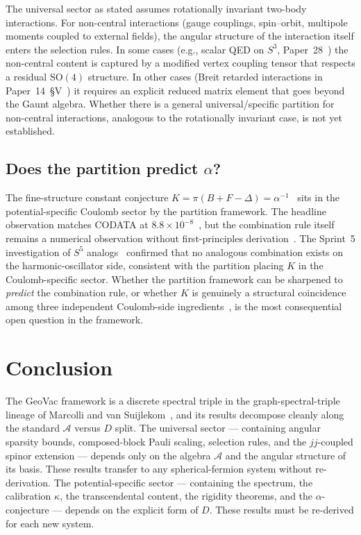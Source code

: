 \documentclass[twocolumn,pra,amsmath,amssymb,superscriptaddress]{revtex4-2}
\begin{document}
The universal sector as stated assumes rotationally invariant
two-body interactions.  For non-central interactions (gauge
couplings, spin--orbit, multipole moments coupled to external
fields), the angular structure of the interaction itself enters the
selection rules.  In some cases (e.g., scalar QED on $S^3$,
Paper~28~\cite{paper28}) the non-central content is captured by a
modified vertex coupling tensor that respects a residual
$\mathrm{SO}(4)$ structure.  In other cases (Breit retarded
interactions in Paper~14~\S V~\cite{paper14}) it requires an
explicit reduced matrix element that goes beyond the Gaunt algebra.
Whether there is a general universal/specific partition for
non-central interactions, analogous to the rotationally invariant
case, is not yet established.

\subsection{Does the partition predict $\alpha$?}

The fine-structure constant conjecture
$K = \pi(B + F - \Delta) = \alpha^{-1}$~\cite{paper2_alpha} sits in
the potential-specific Coulomb sector by the partition framework.
The headline observation matches CODATA at
$8.8 \times 10^{-8}$~\cite{paper2_alpha}, but the combination rule
itself remains a numerical observation without first-principles
derivation~\cite{curve_fit_audit}.  The Sprint~5 investigation of
$S^5$ analogs~\cite{paper25} confirmed that no analogous combination
exists on the harmonic-oscillator side, consistent with the
partition placing $K$ in the Coulomb-specific sector.  Whether the
partition framework can be sharpened to \emph{predict} the
combination rule, or whether $K$ is genuinely a structural
coincidence among three independent Coulomb-side
ingredients~\cite{paper2_alpha}, is the most consequential open
question in the framework.

\section{Conclusion}
\label{sec:conclusion}

The GeoVac framework is a discrete spectral triple in the
graph-spectral-triple lineage of Marcolli and van
Suijlekom~\cite{marcolli_vs2014}, and its results decompose cleanly
along the standard $\mathcal{A}$ versus $D$ split.  The universal
sector --- containing angular sparsity bounds, composed-block Pauli
scaling, selection rules, and the $jj$-coupled spinor extension ---
depends only on the algebra $\mathcal{A}$ and the angular structure
of its basis.  These results transfer to any spherical-fermion system
without re-derivation.  The potential-specific sector --- containing
the spectrum, the calibration $\kappa$, the transcendental content,
the rigidity theorems, and the $\alpha$-conjecture --- depends on
the explicit form of $D$.  These results must be re-derived for each
new system.
\end{document}
